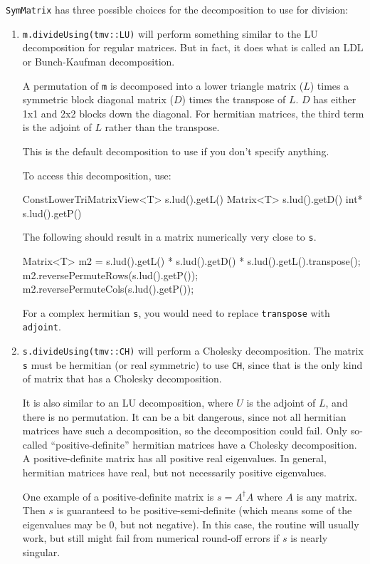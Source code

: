 \documentclass[twoside,letterpaper,11pt]{article}
\renewcommand{\tt}[1]{{\lstinline {#1}}}
\begin{document}
\tt{SymMatrix} has three possible choices for the decomposition to use for division:
\begin{enumerate}
\item
\tt{m.divideUsing(tmv::LU)} will perform something similar to the LU decomposition
for regular matrices.  But in fact, it does what is called an LDL or Bunch-Kaufman
decomposition.  

A permutation of \tt{m} is decomposed into a lower triangle matrix ($L$)
times a symmetric block diagonal matrix ($D$) times the transpose of $L$.
$D$ has either 1x1 and 2x2 blocks down the diagonal.  For hermitian matrices,
the third term is the adjoint of $L$ rather than the transpose.

This is the default decomposition to use if you don't specify anything.

To access this decomposition, use:
\begin{tmvcode}
ConstLowerTriMatrixView<T> s.lud().getL()
Matrix<T> s.lud().getD()
int* s.lud().getP()
\end{tmvcode}
The following should result in a matrix numerically very close to \tt{s}.
\begin{tmvcode}
Matrix<T> m2 = s.lud().getL() * s.lud().getD() * 
      s.lud().getL().transpose();
m2.reversePermuteRows(s.lud().getP());
m2.reversePermuteCols(s.lud().getP());
\end{tmvcode}
For a complex hermitian \tt{s}, you would need to replace
\tt{transpose} with \tt{adjoint}.

\item
\tt{s.divideUsing(tmv::CH)} will perform a Cholesky decomposition.  
The matrix \tt{s} must be hermitian (or real symmetric) to use \tt{CH}, since that is the
only kind of matrix that has a Cholesky decomposition.  

It is also similar to an 
LU decomposition, where $U$ is the adjoint of $L$, and there is no permutation.
It can be a bit dangerous, since not all hermitian matrices have such a decomposition,
so the decomposition could fail.  Only so-called ``positive-definite'' hermitian 
matrices have a Cholesky decomposition.  A positive-definite matrix has
all positive real eigenvalues.  In general, hermitian matrices have real, but
not necessarily positive eigenvalues.  

One example of a 
positive-definite matrix is $s = A^\dagger A$ where $A$ is any matrix.   
Then $s$ is guaranteed to be positive-semi-definite
(which means some of the eigenvalues may be 0, but not negative).
In this case, the routine will usually work, but still might fail from 
numerical round-off errors if $s$ is nearly singular.  


\end{enumerate}
\end{document}
